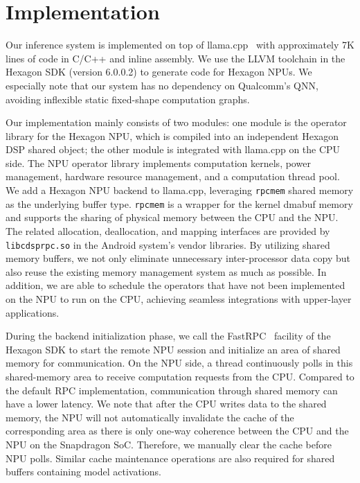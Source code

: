\section{Implementation}

Our inference system is implemented on top of llama.cpp~\cite{llama.cpp} with approximately 7K lines of code in C/C++ and inline assembly. We use the LLVM toolchain in the Hexagon SDK (version 6.0.0.2) to generate code for Hexagon NPUs. We especially note that our system has no dependency on Qualcomm's QNN, avoiding inflexible static fixed-shape computation graphs.

Our implementation mainly consists of two modules: one module is the operator library for the Hexagon NPU, which is compiled into an independent Hexagon DSP shared object; the other module is integrated with llama.cpp on the CPU side. The NPU operator library implements computation kernels, power management, hardware resource management, and a computation thread pool. We add a Hexagon NPU backend to llama.cpp, leveraging \texttt{rpcmem} shared memory as the underlying buffer type. \texttt{rpcmem} is a wrapper for the kernel dmabuf memory and supports the sharing of physical memory between the CPU and the NPU. The related allocation, deallocation, and mapping interfaces are provided by \texttt{libcdsprpc.so} in the Android system’s vendor libraries. By utilizing shared memory buffers, we not only eliminate unnecessary inter-processor data copy but also reuse the existing memory management system as much as possible. In addition, we are able to schedule the operators that have not been implemented on the NPU to run on the CPU, achieving seamless integrations with upper-layer applications.

During the backend initialization phase, we call the FastRPC~\cite{fastrpc} facility of the Hexagon SDK to start the remote NPU session and initialize an area of shared memory for communication. On the NPU side, a thread continuously polls in this shared-memory area to receive computation requests from the CPU. Compared to the default RPC implementation, communication through shared memory can have a lower latency. We note that after the CPU writes data to the shared memory, the NPU will not automatically invalidate the cache of the corresponding area as there is only one-way coherence between the CPU and the NPU on the Snapdragon SoC. Therefore, we manually clear the cache before NPU polls. Similar cache maintenance operations are also required for shared buffers containing model activations.


